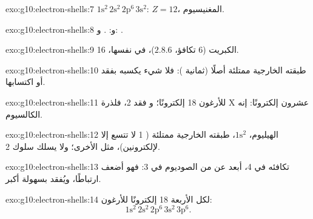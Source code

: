 \begin{solution}{exo:g10:electron-shells:7}
$1\mathrm{s}^2\,2\mathrm{s}^2\,2\mathrm{p}^6\,3\mathrm{s}^2$: $Z = 12$،
المغنيسيوم.
\end{solution}

\begin{solution}{exo:g10:electron-shells:8}
 و: .  و:
.
\end{solution}

\begin{solution}{exo:g10:electron-shells:9}
الكبريت (6  تكافؤ، $2.8.6$)، في  نفسها، 16.
\end{solution}

\begin{solution}{exo:g10:electron-shells:10}
طبقته الخارجية ممتلئة أصلًا (ثمانية ): فلا شيء يكسبه بفقد 
أو اكتسابها.
\end{solution}

\begin{solution}{exo:g10:electron-shells:11}
للأرغون 18 إلكترونًا؛ و فقد 2، فلذرة X عشرون إلكترونًا: إنه الكالسيوم.
\end{solution}

\begin{solution}{exo:g10:electron-shells:12}
الهيليوم، $1\mathrm{s}^2$، طبقته الخارجية ممتلئة ( 1 لا تتسع إلا
لإلكترونين)، مثل  الأخرى؛ ولا يسلك سلوك  
2.
\end{solution}

\begin{solution}{exo:g10:electron-shells:13}
 تكافئه في  4، أبعد عن  من  الصوديوم في  3:
فهو أضعف ارتباطًا، ويُفقد بسهولة أكبر.
\end{solution}

\begin{solution}{exo:g10:electron-shells:14}
لكل  الأربعة 18 إلكترونًا  للأرغون:
\[ 1\mathrm{s}^2\,2\mathrm{s}^2\,2\mathrm{p}^6\,3\mathrm{s}^2\,3\mathrm{p}^6. \]
\end{solution}

